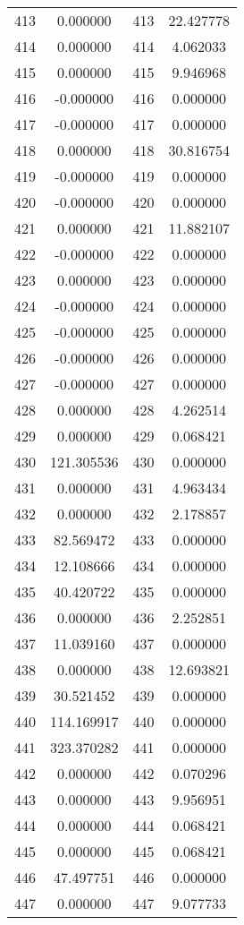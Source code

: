 \documentclass[12pt]{article}
\begin{document}
\begin{longtable}{@{}cccc@{}}
413 & 0.000000 & 413 & 22.427778 \\
414 & 0.000000 & 414 & 4.062033 \\
415 & 0.000000 & 415 & 9.946968 \\
416 & -0.000000 & 416 & 0.000000 \\
417 & -0.000000 & 417 & 0.000000 \\
418 & 0.000000 & 418 & 30.816754 \\
419 & -0.000000 & 419 & 0.000000 \\
420 & -0.000000 & 420 & 0.000000 \\
421 & 0.000000 & 421 & 11.882107 \\
422 & -0.000000 & 422 & 0.000000 \\
423 & 0.000000 & 423 & 0.000000 \\
424 & -0.000000 & 424 & 0.000000 \\
425 & -0.000000 & 425 & 0.000000 \\
426 & -0.000000 & 426 & 0.000000 \\
427 & -0.000000 & 427 & 0.000000 \\
428 & 0.000000 & 428 & 4.262514 \\
429 & 0.000000 & 429 & 0.068421 \\
430 & 121.305536 & 430 & 0.000000 \\
431 & 0.000000 & 431 & 4.963434 \\
432 & 0.000000 & 432 & 2.178857 \\
433 & 82.569472 & 433 & 0.000000 \\
434 & 12.108666 & 434 & 0.000000 \\
435 & 40.420722 & 435 & 0.000000 \\
436 & 0.000000 & 436 & 2.252851 \\
437 & 11.039160 & 437 & 0.000000 \\
438 & 0.000000 & 438 & 12.693821 \\
439 & 30.521452 & 439 & 0.000000 \\
440 & 114.169917 & 440 & 0.000000 \\
441 & 323.370282 & 441 & 0.000000 \\
442 & 0.000000 & 442 & 0.070296 \\
443 & 0.000000 & 443 & 9.956951 \\
444 & 0.000000 & 444 & 0.068421 \\
445 & 0.000000 & 445 & 0.068421 \\
446 & 47.497751 & 446 & 0.000000 \\
447 & 0.000000 & 447 & 9.077733 \\

\end{longtable}
\end{document}
